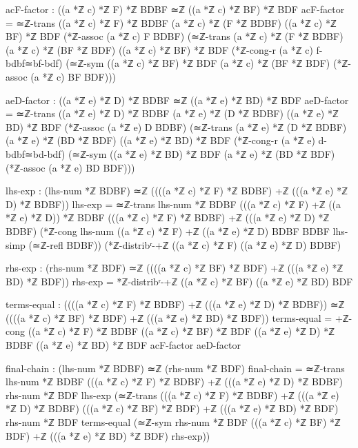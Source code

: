 \documentclass[11pt,a4paper]{book}
\begin{document}
\begin{code}
        acF-factor : ((a *ℤ c) *ℤ F) *ℤ BDBF ≃ℤ ((a *ℤ c) *ℤ BF) *ℤ BDF
        acF-factor = ≃ℤ-trans {((a *ℤ c) *ℤ F) *ℤ BDBF} {(a *ℤ c) *ℤ (F *ℤ BDBF)} {((a *ℤ c) *ℤ BF) *ℤ BDF}
                      (*ℤ-assoc (a *ℤ c) F BDBF)
                      (≃ℤ-trans {(a *ℤ c) *ℤ (F *ℤ BDBF)} {(a *ℤ c) *ℤ (BF *ℤ BDF)} {((a *ℤ c) *ℤ BF) *ℤ BDF}
                        (*ℤ-cong-r (a *ℤ c) f-bdbf≃bf-bdf)
                        (≃ℤ-sym {((a *ℤ c) *ℤ BF) *ℤ BDF} {(a *ℤ c) *ℤ (BF *ℤ BDF)} (*ℤ-assoc (a *ℤ c) BF BDF)))

        aeD-factor : ((a *ℤ e) *ℤ D) *ℤ BDBF ≃ℤ ((a *ℤ e) *ℤ BD) *ℤ BDF  
        aeD-factor = ≃ℤ-trans {((a *ℤ e) *ℤ D) *ℤ BDBF} {(a *ℤ e) *ℤ (D *ℤ BDBF)} {((a *ℤ e) *ℤ BD) *ℤ BDF}
                      (*ℤ-assoc (a *ℤ e) D BDBF)
                      (≃ℤ-trans {(a *ℤ e) *ℤ (D *ℤ BDBF)} {(a *ℤ e) *ℤ (BD *ℤ BDF)} {((a *ℤ e) *ℤ BD) *ℤ BDF}
                        (*ℤ-cong-r (a *ℤ e) d-bdbf≃bd-bdf)
                        (≃ℤ-sym {((a *ℤ e) *ℤ BD) *ℤ BDF} {(a *ℤ e) *ℤ (BD *ℤ BDF)} (*ℤ-assoc (a *ℤ e) BD BDF)))
        
        lhs-exp : (lhs-num *ℤ BDBF) ≃ℤ ((((a *ℤ c) *ℤ F) *ℤ BDBF) +ℤ (((a *ℤ e) *ℤ D) *ℤ BDBF))
        lhs-exp = ≃ℤ-trans {lhs-num *ℤ BDBF} {(((a *ℤ c) *ℤ F) +ℤ ((a *ℤ e) *ℤ D)) *ℤ BDBF}
                   {(((a *ℤ c) *ℤ F) *ℤ BDBF) +ℤ (((a *ℤ e) *ℤ D) *ℤ BDBF)}
                   (*ℤ-cong {lhs-num} {((a *ℤ c) *ℤ F) +ℤ ((a *ℤ e) *ℤ D)} {BDBF} {BDBF}
                            lhs-simp (≃ℤ-refl BDBF))
                   (*ℤ-distribʳ-+ℤ ((a *ℤ c) *ℤ F) ((a *ℤ e) *ℤ D) BDBF)
                   
        rhs-exp : (rhs-num *ℤ BDF) ≃ℤ ((((a *ℤ c) *ℤ BF) *ℤ BDF) +ℤ (((a *ℤ e) *ℤ BD) *ℤ BDF))
        rhs-exp = *ℤ-distribʳ-+ℤ ((a *ℤ c) *ℤ BF) ((a *ℤ e) *ℤ BD) BDF

        terms-equal : ((((a *ℤ c) *ℤ F) *ℤ BDBF) +ℤ (((a *ℤ e) *ℤ D) *ℤ BDBF)) ≃ℤ 
                      ((((a *ℤ c) *ℤ BF) *ℤ BDF) +ℤ (((a *ℤ e) *ℤ BD) *ℤ BDF))
        terms-equal = +ℤ-cong {((a *ℤ c) *ℤ F) *ℤ BDBF} {((a *ℤ c) *ℤ BF) *ℤ BDF}
                              {((a *ℤ e) *ℤ D) *ℤ BDBF} {((a *ℤ e) *ℤ BD) *ℤ BDF}
                              acF-factor aeD-factor

        final-chain : (lhs-num *ℤ BDBF) ≃ℤ (rhs-num *ℤ BDF)
        final-chain = ≃ℤ-trans {lhs-num *ℤ BDBF} 
                        {(((a *ℤ c) *ℤ F) *ℤ BDBF) +ℤ (((a *ℤ e) *ℤ D) *ℤ BDBF)}
                        {rhs-num *ℤ BDF}
                        lhs-exp
                        (≃ℤ-trans {(((a *ℤ c) *ℤ F) *ℤ BDBF) +ℤ (((a *ℤ e) *ℤ D) *ℤ BDBF)}
                                  {(((a *ℤ c) *ℤ BF) *ℤ BDF) +ℤ (((a *ℤ e) *ℤ BD) *ℤ BDF)}
                                  {rhs-num *ℤ BDF}
                                  terms-equal
                                  (≃ℤ-sym {rhs-num *ℤ BDF}
                                          {(((a *ℤ c) *ℤ BF) *ℤ BDF) +ℤ (((a *ℤ e) *ℤ BD) *ℤ BDF)}
                                          rhs-exp))


\end{code}
\end{document}
